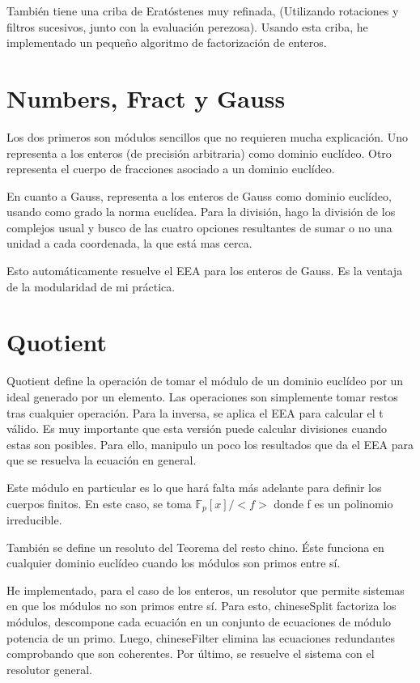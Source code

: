\documentclass[12pt, a5paper]{article}
\theoremstyle{definition}
\begin{document}
También tiene una criba de Eratóstenes muy refinada, (Utilizando
rotaciones y filtros sucesivos, junto con la evaluación perezosa).
Usando esta criba, he implementado un pequeño algoritmo de
factorización de enteros.
\newpage\newpage

\section{Numbers, Fract y Gauss}
Los dos primeros son  módulos sencillos que no requieren mucha explicación.
Uno representa a los enteros (de precisión arbitraria) como dominio
euclídeo. Otro representa el cuerpo de fracciones asociado a un
dominio euclídeo.

En cuanto a Gauss, representa a los enteros de Gauss como dominio
euclídeo, usando como grado la norma euclídea. Para la división, hago
la división de los complejos usual y busco de las cuatro opciones
resultantes de sumar o no una unidad a cada coordenada, la que está
mas cerca.

Esto automáticamente resuelve el EEA para los enteros de Gauss. Es la
ventaja de la modularidad de mi práctica.

\newpage



\newpage

\section{Quotient}
Quotient define la operación de tomar el módulo de un dominio euclídeo
por un ideal generado por un elemento. Las operaciones son simplemente
tomar restos tras cualquier operación. Para la inversa, se aplica el
EEA para calcular el t válido. Es muy importante que esta versión
puede calcular divisiones cuando estas son posibles. Para ello,
manipulo un poco los resultados que da el EEA para que se resuelva la
ecuación en general.

Este módulo en particular es lo que hará falta más adelante para definir los
cuerpos finitos. En este caso, se toma $\mathbb{F}_p[x]/<f>$ donde f es un polinomio
irreducible. 

También se define un resoluto del Teorema del resto chino. Éste
funciona en cualquier dominio euclídeo cuando los módulos son primos
entre sí.

He implementado, para el caso de los enteros, un resolutor que permite
sistemas en que los módulos no son primos entre sí. Para esto, 
chineseSplit factoriza los módulos, descompone cada ecuación en un
conjunto de ecuaciones de módulo potencia de un primo. Luego,
chineseFilter elimina las ecuaciones redundantes comprobando que son
coherentes. Por último, se resuelve el sistema con el resolutor
general.
\end{document}
